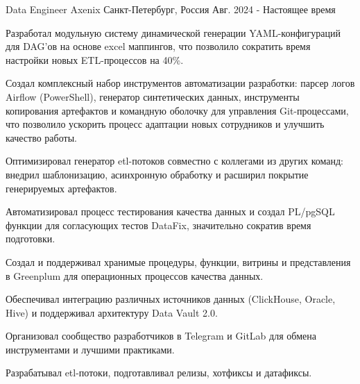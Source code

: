 

\begin{cventries}

  \cventry
    {Data Engineer} %
    {Axenix} %
    {Санкт-Петербург, Россия} %
    {Авг. 2024 - Настоящее время} %
    {
      \begin{cvitems} %
        \item {Разработал модульную систему динамической генерации YAML-конфигураций для DAG'ов на основе excel маппингов, что позволило сократить время настройки новых ETL-процессов на 40\%.}
        \item {Создал комплексный набор инструментов автоматизации разработки: парсер логов Airflow (PowerShell), генератор синтетических данных, инструменты копирования артефактов и командную оболочку для управления Git-процессами, что позволило ускорить процесс адаптации новых сотрудников и улучшить качество работы.}
        \item {Оптимизировал генератор etl-потоков совместно с коллегами из других команд: внедрил шаблонизацию, асинхронную обработку и расширил покрытие генерируемых артефактов.}
        \item {Автоматизировал процесс тестирования качества данных и создал PL/pgSQL функции для согласующих тестов DataFix, значительно сократив время подготовки.}
        \item {Создал и поддерживал хранимые процедуры, функции, витрины и представления в Greenplum для операционных процессов качества данных.}
        \item {Обеспечивал интеграцию различных источников данных (ClickHouse, Oracle, Hive) и поддерживал архитектуру Data Vault 2.0.}
        \item {Организовал сообщество разработчиков в Telegram и GitLab для обмена инструментами и лучшими практиками.}
        \item {Разрабатывал etl-потоки, подготавливал релизы, хотфиксы и датафиксы.}
      \end{cvitems}
    }


\end{cventries}
